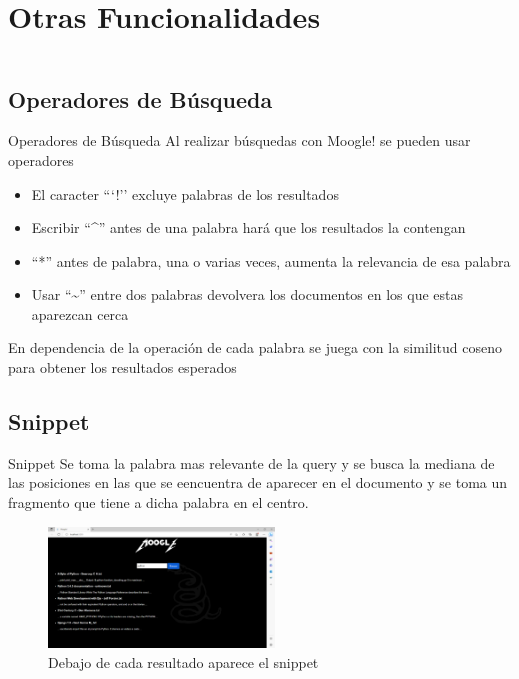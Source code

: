 \section{Otras Funcionalidades}

\begin{frame}
    \begin{columns}[t]
        \begin{column}{.5\textwidth}
          \tableofcontents[sections={1-2},currentsection]
        \end{column}
        \begin{column}{.5\textwidth}
          \tableofcontents[sections={3-4},currentsection]
        \end{column}
    \end{columns}
\end{frame}

\subsection{Operadores de Búsqueda}
\begin{frame}[fragile]{Operadores de Búsqueda}
Al realizar búsquedas con Moogle! se pueden usar operadores

\begin{itemize}
\item El caracter ```!'' excluye palabras de los resultados
\item Escribir ``\^{}'' antes de una palabra hará que los resultados la contengan
\item ``*'' antes de palabra, una o varias veces, aumenta la relevancia de esa palabra
\item Usar ``\~{}'' entre dos palabras devolvera los documentos en los que estas aparezcan cerca
\end{itemize}
\pause

En dependencia de la operación de cada palabra se juega con la similitud coseno para obtener los resultados esperados 

\end{frame}

\subsection{Snippet}
\begin{frame}[fragile]{Snippet}
Se toma la palabra mas relevante de la query y se busca la mediana de las posiciones en
las que se eencuentra de aparecer en el documento y se toma un fragmento
que tiene a dicha palabra en el centro.

\begin{figure}[h]
    \center
    \includegraphics[width=6cm]{busqueda2.png}
    \caption{Debajo de cada resultado aparece el snippet}
\end{figure}

\end{frame}

